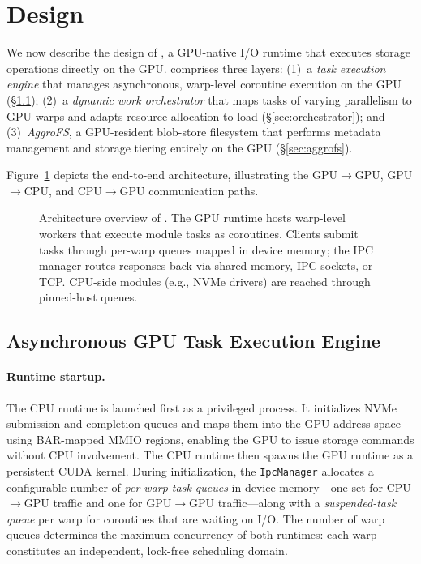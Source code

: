 \section{Design}
\label{sec:design}

We now describe the design of \sysname{}, a GPU-native I/O runtime
that executes storage operations directly on the GPU.
\sysname{} comprises three layers: (1)~a \emph{task execution engine}
that manages asynchronous, warp-level coroutine execution on the GPU
(\S\ref{sec:exec-engine}); (2)~a \emph{dynamic work orchestrator} that
maps tasks of varying parallelism to GPU warps and adapts resource
allocation to load (\S\ref{sec:orchestrator}); and (3)~\emph{AggroFS},
a GPU-resident blob-store filesystem that performs metadata management
and storage tiering entirely on the GPU (\S\ref{sec:aggrofs}).

Figure~\ref{fig:arch-overview} depicts the end-to-end architecture,
illustrating the GPU$\rightarrow$GPU, GPU$\rightarrow$CPU, and
CPU$\rightarrow$GPU communication paths.

\begin{figure}[t]
  \centering
  
  \caption{%
    Architecture overview of \sysname{}.  The GPU runtime hosts
    warp-level workers that execute module tasks as coroutines.
    Clients submit tasks through per-warp queues mapped in device
    memory; the IPC manager routes responses back via shared memory,
    IPC sockets, or TCP\@.  CPU-side modules (e.g., NVMe drivers) are
    reached through pinned-host queues.}
  \label{fig:arch-overview}
\end{figure}

\subsection{Asynchronous GPU Task Execution Engine}
\label{sec:exec-engine}

\paragraph{Runtime startup.}
The CPU runtime is launched first as a privileged process.
It initializes NVMe submission and completion queues and maps them
into the GPU address space using BAR-mapped MMIO regions, enabling
the GPU to issue storage commands without CPU involvement.
The CPU runtime then spawns the GPU runtime as a persistent CUDA
kernel.  During initialization, the \texttt{IpcManager} allocates a
configurable number of \emph{per-warp task queues} in device memory---one
set for CPU$\rightarrow$GPU traffic and one for GPU$\rightarrow$GPU
traffic---along with a \emph{suspended-task queue} per warp for
coroutines that are waiting on I/O\@.
The number of warp queues determines the maximum concurrency of both
runtimes: each warp constitutes an independent, lock-free scheduling
domain.

